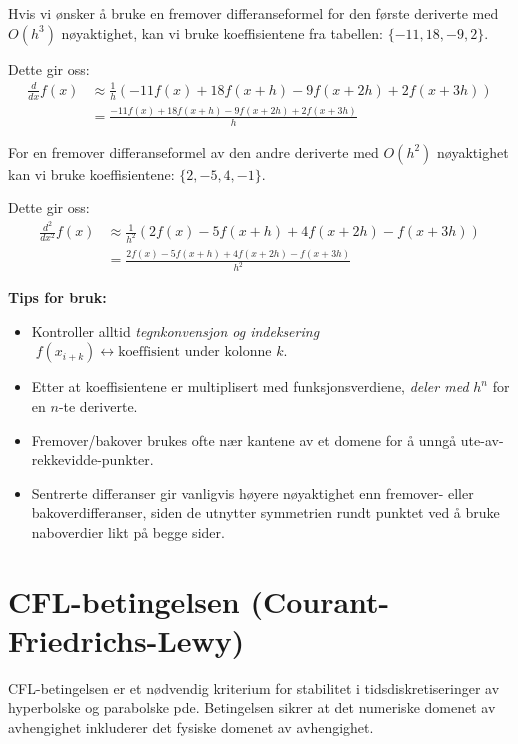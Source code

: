 \begin{example}{}{}
  Hvis vi ønsker å bruke en fremover differanseformel for den første deriverte med $O(h^3)$ nøyaktighet, kan vi bruke koeffisientene fra tabellen: \( \{-11, 18, -9, 2\} \).
  
  Dette gir oss:
  \begin{align*}
    \frac{d}{dx} f(x) & \approx \frac{1}{h} \left( -11f(x) + 18f(x+h) - 9f(x+2h) + 2f(x+3h) \right) \\
                     & = \frac{-11f(x) + 18f(x+h) - 9f(x+2h) + 2f(x+3h)}{h}
  \end{align*}

  For en fremover differanseformel av den andre deriverte med $O(h^2)$ nøyaktighet kan vi bruke koeffisientene: \(\{2, -5, 4, -1\}\).
  
  \medskip
  
  Dette gir oss:
  \begin{align*}
    \frac{d^2}{dx^2} f(x) & \approx \frac{1}{h^2} \left( 2f(x) - 5f(x+h) + 4f(x+2h) - f(x+3h) \right) \\
                         & = \frac{2f(x) - 5f(x+h) + 4f(x+2h) - f(x+3h)}{h^2}
  \end{align*}
\end{example}

\vspace{1em}

\noindent\textbf{Tips for bruk:}
\begin{itemize}
	\item Kontroller alltid \emph{tegnkonvensjon og indeksering} \(\;f(x_{i+k}) \leftrightarrow \text{koeffisient under kolonne }k\).
	\item Etter at koeffisientene er multiplisert med funksjonsverdiene, \emph{deler med} \(h^n\) for en \(n\)-te deriverte.
	\item Fremover/bakover brukes ofte nær kantene av et domene for å unngå ute-av-rekkevidde-punkter.
	\item Sentrerte differanser gir vanligvis høyere nøyaktighet enn fremover- eller bakoverdifferanser, siden de utnytter symmetrien rundt punktet ved å bruke naboverdier likt på begge sider.
\end{itemize}

\section{CFL-betingelsen (Courant-Friedrichs-Lewy)}

CFL-betingelsen er et nødvendig kriterium for stabilitet i tidsdiskretiseringer av hyperbolske og parabolske \gls{pde}. Betingelsen sikrer at det numeriske domenet av avhengighet inkluderer det fysiske domenet av avhengighet.

